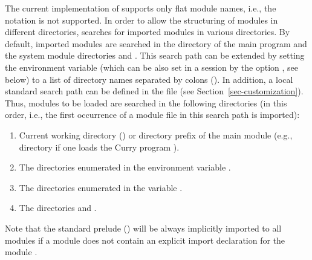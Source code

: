 The current implementation of \CYS supports only flat module names,
i.e., the notation  is not supported.
In order to allow the structuring of modules in different directories,
\CYS searches for imported modules in various directories.
By default, imported modules are searched in the directory
of the main program and the system module directories
 and .
This search path can be extended
by setting the environment variable 
(which can be also set in a \CYS session by the option
,
see below)
to a list of directory names separated by colons (\ccode{:}).
In addition, a local standard search path
can be defined in the  file
(see Section~\ref{sec-customization}).
Thus, modules to be loaded are searched in the following
directories (in this order, i.e., the first occurrence of a module file
in this search path is imported):
\begin{enumerate}
\item Current working directory () or directory prefix
of the main module (e.g., directory 
if one loads the Curry program ).
\item The directories enumerated in the environment variable .
\item The directories enumerated in the  variable
      .
\item The directories  and .
\end{enumerate}
Note that the standard prelude ()
will be always implicitly imported to all modules if a module
does not contain an explicit import declaration for the module
.
